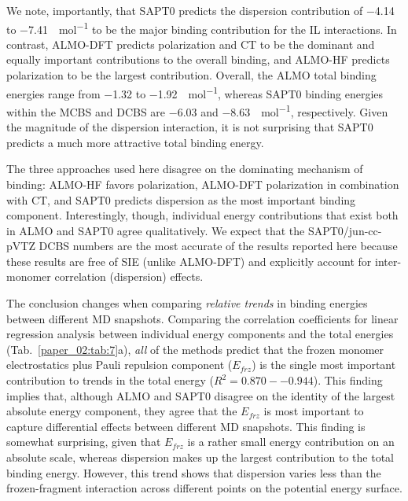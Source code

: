 We note, importantly, that SAPT0 predicts the dispersion contribution of \num{-4.14} to \SI{-7.41}{\kcal\per\mole} to be the major binding contribution for the \textendash{}IL interactions. In contrast, ALMO-DFT predicts polarization and CT to be the dominant and equally important contributions to the overall binding, and ALMO-HF predicts polarization to be the largest contribution. Overall, the ALMO total binding energies range from \num{-1.32} to \SI{-1.92}{\kcal\per\mole}, whereas SAPT0 binding energies within the MCBS and DCBS are \num{-6.03} and \SI{-8.63}{\kcal\per\mole}, respectively. Given the magnitude of the dispersion interaction, it is not surprising that SAPT0 predicts a much more attractive total binding energy.

The three approaches used here disagree on the dominating mechanism of binding: ALMO-HF favors polarization, ALMO-DFT polarization in combination with CT, and SAPT0 predicts dispersion as the most important binding component. Interestingly, though, individual energy contributions that exist both in ALMO and SAPT0 agree qualitatively. We expect that the SAPT0/jun-cc-pVTZ DCBS numbers are the most accurate of the results reported here because these results are free of SIE (unlike ALMO-DFT) and explicitly account for inter-monomer correlation (dispersion) effects.

The conclusion changes when comparing \emph{relative trends} in binding energies between different MD snapshots. Comparing the correlation coefficients for linear regression analysis between individual energy components and the total energies (Tab.~\ref{paper_02:tab:7}a), \emph{all} of the methods predict that the frozen monomer electrostatics plus Pauli repulsion component (\(E_{frz}\)) is the single most important contribution to trends in the total energy (\(R^2 = 0.870 -- 0.944\)). This finding implies that, although ALMO and SAPT0 disagree on the identity of the largest absolute energy component, they agree that the \(E_{frz}\) is most important to capture differential effects between different MD snapshots. This finding is somewhat surprising, given that \(E_{frz}\) is a rather small energy contribution on an absolute scale, whereas dispersion makes up the largest contribution to the total binding energy. However, this trend shows that dispersion varies less than the frozen-fragment interaction across different points on the potential energy surface.

